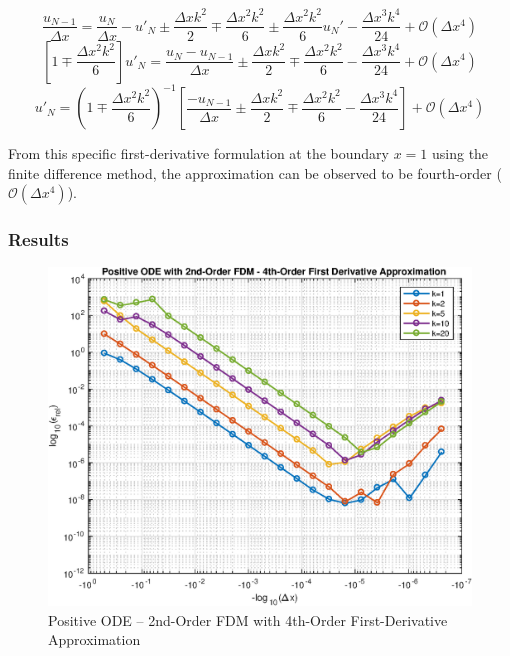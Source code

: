 \documentclass[10pt, reqno]{article}		%
\numberwithin{equation}{section}
\begin{document}
\begin{equation}
\frac{u_{N-1}}{\Delta x} = \frac{u_N}{\Delta x} -u'_N \pm \frac{\Delta x k^2}{2} \mp \frac{\Delta x^2 k^2}{6} \pm \frac{\Delta x^2 k^2}{6} u_N' - \frac{\Delta x^3 k^4}{24} + \mathcal{O}(\Delta x^4)
\end{equation}
\begin{equation}
\left[1 \mp \frac{\Delta x^2k^2}{6}\right] u'_N = \frac{u_N - u_{N-1}}{\Delta x} \pm \frac{\Delta x k^2}{2} \mp \frac{\Delta x^2 k^2}{6} - \frac{\Delta x^3 k^4}{24} + \mathcal{O}(\Delta x^4)
\end{equation}
\begin{equation}
u'_N = \left(1 \mp \frac{\Delta x^2k^2}{6}\right)^{-1} \left[\frac{- u_{N-1}}{\Delta x} \pm \frac{\Delta x k^2}{2} \mp \frac{\Delta x^2 k^2}{6} - \frac{\Delta x^3 k^4}{24}\right] + \mathcal{O}(\Delta x^4)
\end{equation}

From this specific first-derivative formulation at the boundary $x = 1$ using the finite difference method, the approximation can be observed to be fourth-order ($\mathcal{O}(\Delta x^4)$).

\newpage

\subsubsection{Results}

\begin{figure}[H]
	\begin{center}
		\includegraphics[width = 0.76\linewidth]{positive_ode_order_2_fd_order_4}
		\caption{Positive ODE -- 2nd-Order FDM with 4th-Order First-Derivative Approximation}	
	\end{center}
\end{figure}
\end{document}
